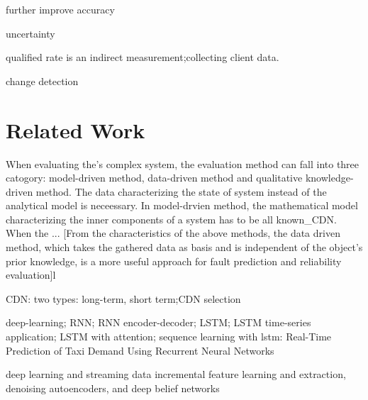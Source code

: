 \documentclass[review]{elsarticle}
\begin{document}
further improve accuracy

uncertainty

qualified rate is an indirect measurement;collecting client data.

change detection
\section{Related Work}
When evaluating the's complex system, the evaluation method can fall into three catogory: model-driven method, data-driven method and qualitative knowledge-driven method. The data characterizing the state of system instead of the analytical model is neceessary. In model-drvien method, the mathematical model characterizing the inner 
components of a system has to be all known{\Rethinking_CDN}. When the 
\cite{Jiang2017Pytheas}.\cite{Mao2017NeuralPensieve}.\cite{c}. [From the characteristics of the above methods, the data driven method, which takes the gathered data
as basis and is independent of the object’s prior knowledge, is a more
useful approach for fault prediction and reliability evaluation]l

CDN: two types: long-term, short term;CDN selection \cite{Jiang2017Pytheas:Exploration-Exploitation}

deep-learning; RNN; RNN encoder-decoder; LSTM; LSTM time-series application; LSTM with attention; sequence learning with lstm:
Real-Time Prediction of Taxi Demand Using Recurrent Neural Networks

deep learning and streaming data \cite{Najafabadi2015DeepAnalytics} incremental feature learning and extraction, denoising autoencoders, and deep belief networks
\end{document}
